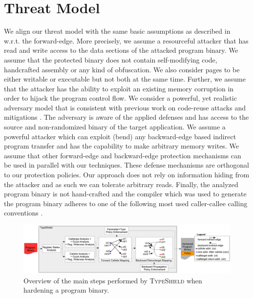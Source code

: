 \section{Threat Model}
\label{Adversary Model}

We align our threat model with the same basic assumptions as described in~\cite{veen:typearmor} w.r.t. the forward-edge.
More precisely, we assume a resourceful attacker that has read and write access to the data 
sections of the attacked program binary. We assume that the protected binary does not contain 
self-modifying code, handcrafted assembly or any kind of obfuscation. We also consider pages 
to be either writable or executable but not both at the same time. Further, we assume 
that the attacker has the ability to exploit an existing memory corruption in order to hijack the program
control flow. 
We consider a powerful, yet realistic adversary
model that is consistent with previous work on code-reuse
attacks and mitigations \cite{volodymyr:cpi}. 
The adversary is aware of the
applied defenses and has access to the source and non-randomized 
binary of the target application.
We assume a powerful attacker which can exploit (bend)
any backward-edge based indirect program transfer and
has the capability to make arbitrary memory writes. 
We assume that other forward-edge and backward-edge protection mechanisms
can be used in parallel with our techniques.
These defense
mechanisms are orthogonal to our protection policies. Our
approach does not rely on information hiding from the
attacker and as such we can tolerate arbitrary reads. 
Finally, the analyzed program binary is not hand-crafted and the compiler which was used
to generate the program binary adheres to one of the 
following most used caller-callee calling conventions \cite{arm:abi, microsoft:abi, itanium:abi}.

\begin{center}
\begin{figure}[t!]
\centering
   \includegraphics[width=.88\textwidth]{figures/overview.pdf}
    \caption{Overview of the main steps performed by \textsc{TypeShield} when hardening a program binary.}
    \label{System overview.}
    \vspace{-.5cm}
 \end{figure}
\end{center}